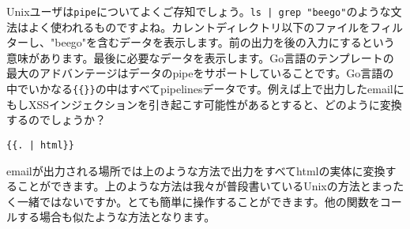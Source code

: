 Unixユーザは\texttt{pipe}についてよくご存知でしょう。\texttt{ls | grep "beego"}のような文法はよく使われるものですよね。カレントディレクトリ以下のファイルをフィルターし、"beego"を含むデータを表示します。前の出力を後の入力にするという意味があります。最後に必要なデータを表示します。Go言語のテンプレートの最大のアドバンテージはデータのpipeをサポートしていることです。Go言語の中でいかなる\texttt{\{\{\}\}}の中はすべてpipelinesデータです。例えば上で出力したemailにもしXSSインジェクションを引き起こす可能性があるとすると、どのように変換するのでしょうか？

\begin{lstlisting}[numbers=none]
{{. | html}}
\end{lstlisting}

emailが出力される場所では上のような方法で出力をすべてhtmlの実体に変換することができます。上のような方法は我々が普段書いているUnixの方法とまったく一緒ではないですか。とても簡単に操作することができます。他の関数をコールする場合も似たような方法となります。










